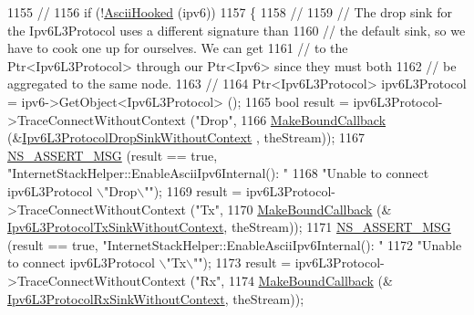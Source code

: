 \begin{DoxyCode}
1155       \textcolor{comment}{//}
1156       \textcolor{keywordflow}{if} (!\hyperlink{classns3_1_1InternetStackHelper_a4b26d61d78933a884a03fbda4ec6eddc}{AsciiHooked} (ipv6))
1157         \{
1158           \textcolor{comment}{//}
1159           \textcolor{comment}{// The drop sink for the Ipv6L3Protocol uses a different signature than}
1160           \textcolor{comment}{// the default sink, so we have to cook one up for ourselves.  We can get}
1161           \textcolor{comment}{// to the Ptr<Ipv6L3Protocol> through our Ptr<Ipv6> since they must both }
1162           \textcolor{comment}{// be aggregated to the same node.}
1163           \textcolor{comment}{//}
1164           Ptr<Ipv6L3Protocol> ipv6L3Protocol = ipv6->GetObject<Ipv6L3Protocol> ();
1165           \textcolor{keywordtype}{bool} result = ipv6L3Protocol->TraceConnectWithoutContext (\textcolor{stringliteral}{"Drop"},
1166                                                                     
      \hyperlink{group__makeboundcallback_ga1725d6362e6065faa0709f7c93f8d770}{MakeBoundCallback} (&\hyperlink{namespacens3_a7ced21c98bc6aea53aacc04207dcf51c}{Ipv6L3ProtocolDropSinkWithoutContext}
      , theStream));
1167           \hyperlink{assert_8h_aff5ece9066c74e681e74999856f08539}{NS\_ASSERT\_MSG} (result == \textcolor{keyword}{true}, \textcolor{stringliteral}{"InternetStackHelper::EnableAsciiIpv6Internal():  "}
1168                          \textcolor{stringliteral}{"Unable to connect ipv6L3Protocol \(\backslash\)"Drop\(\backslash\)""});
1169           result = ipv6L3Protocol->TraceConnectWithoutContext (\textcolor{stringliteral}{"Tx"}, 
1170                                                                \hyperlink{group__makeboundcallback_ga1725d6362e6065faa0709f7c93f8d770}{MakeBoundCallback} (&
      \hyperlink{namespacens3_afefdbba2df6c6e8aaaf8cd04d4c65ed8}{Ipv6L3ProtocolTxSinkWithoutContext}, theStream));
1171           \hyperlink{assert_8h_aff5ece9066c74e681e74999856f08539}{NS\_ASSERT\_MSG} (result == \textcolor{keyword}{true}, \textcolor{stringliteral}{"InternetStackHelper::EnableAsciiIpv6Internal():  "}
1172                          \textcolor{stringliteral}{"Unable to connect ipv6L3Protocol \(\backslash\)"Tx\(\backslash\)""});
1173           result = ipv6L3Protocol->TraceConnectWithoutContext (\textcolor{stringliteral}{"Rx"}, 
1174                                                                \hyperlink{group__makeboundcallback_ga1725d6362e6065faa0709f7c93f8d770}{MakeBoundCallback} (&
      \hyperlink{namespacens3_afebee98eb19d40184517bb4806b90130}{Ipv6L3ProtocolRxSinkWithoutContext}, theStream));

\end{DoxyCode}

